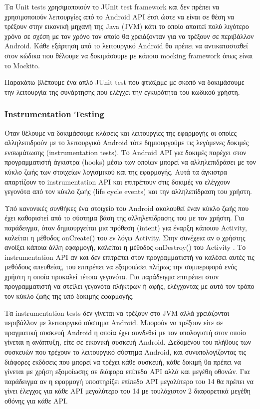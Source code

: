 		Τα Unit tests χρησιμοποιούν το JUnit test framework και δεν πρέπει να χρησιμοποιούν λειτουργίες από το Android API έτσι ώστε να είναι σε θέση να τρέξουν στην εικονική μηχανή της Java (JVM) κάτι το οποίο απαιτεί πολύ λιγότερο χρόνο σε σχέση με τον χρόνο τον οποίο θα χρειάζονταν για να τρέξουν σε περιβάλλον Android. Κάθε εξάρτηση από το λειτουργικό Android θα πρέπει να αντικατασταθεί στον κώδικα που θέλουμε να δοκιμάσουμε με κάποιο mocking framework όπως είναι το Mockito. 
		
		Παρακάτω βλέπουμε ένα απλό JUnit test που φτιάξαμε με σκοπό να δοκιμάσουμε την λειτουργία της συνάρτησης που ελέγχει την εγκυρότητα του κωδικού χρήστη.
		
		  

		\subsubsection{Instrumentation Testing}\label{sssec:instrumentation_testing}

		Όταν θέλουμε να δοκιμάσουμε κλάσεις και λειτουργίες της εφαρμογής οι οποίες αλληλεπιδρούν με το λειτουργικό Android τότε δημιουργούμε τις λεγόμενες δοκιμές ενσωμάτωσης (instrumentation tests). Το Android API για δοκιμές παρέχει στον προγραμματιστή άγκιστρα (hooks) μέσω των οποίων μπορεί να αλληλεπιδράσει με τον κύκλο ζωής των στοιχείων λογισμικού και της εφαρμογής. Αυτά τα άγκιστρα απαρτίζουν το instrumentation API και επιτρέπουν στις δοκιμές να ελέγχουν γεγονότα από τον κύκλο ζωής (life cycle events) και την αλληλεπίδραση του χρήστη.

		Υπό κανονικές συνθήκες ένα στοιχείο του Android ακολουθεί έναν κύκλο ζωής που έχει καθοριστεί από το σύστημα βάση της αλληλεπίδρασης του με τον χρήστη. Για παράδειγμα, όταν δημιουργείται μια πρόθεση (intent) για έναρξη κάποιου Activity, καλείται η μέθοδος onCreate() του εν λόγω Activity. Στην συνέχεια αν ο χρήστης ανοίξει κάποια άλλη εφαρμογή, καλείται η μέθοδος onDestroy() του Activity . Το instrumentation API αν και δεν επιτρέπει στον προγραμματιστή να καλέσει αυτές τις μεθόδους απευθείας, του επιτρέπει να εξομοιώσει πλήρως την συμπεριφορά ενός χρήστη η οποία προκαλεί τέτοια γεγονότα. Για παράδειγμα επιτρέπει στον προγραμματιστή να στείλει γεγονότα πλήκτρων ή αφής, ελέγχοντας με αυτό τον τρόπο τον κύκλο ζωής της υπό δοκιμής εφαρμογής\cite{androidTestingBook}.

		Τα instrumentation tests δεν γίνεται να τρέξουν στο JVM αλλά χρειάζονται περιβάλλον με λειτουργικό σύστημα Android. Μπορούν να τρέξουν είτε σε πραγματική συσκευή Android η οποία έχει συνδεθεί με τον υπολογιστή στον οποίο γίνεται η ανάπτυξη, είτε σε εικονική συσκευή Android. Δεδομένου του πλήθους των συσκευών που τρέχουν το λειτουργικό σύστημα Android, και συνυπολογίζοντας τις διάφορες εκδόσεις που μπορεί να τρέχει κάθε συσκευή, κάθε δοκιμή θα πρέπει να γίνεται με χρήση εξομοίωσης σε διάφορα επίπεδα API αλλά και μεγέθη οθονών. Για παράδειγμα αν η εφαρμογή υποστηρίζει επίπεδο API μεγαλύτερο του 14 θα πρέπει να γίνει έλεγχος για κάθε API μεγαλύτερο του 14 με τουλάχιστον 2 διαφορετικά μεγέθη οθόνης για κάθε API. 
		
